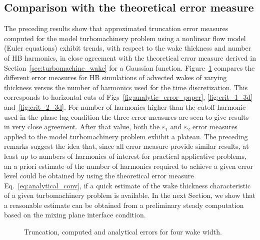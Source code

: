 \subsection{Comparison with the theoretical error measure}
\label{sub:comp_w_analytic}


The preceding results show that approximated truncation error 
measures computed for the model turbomachinery problem 
using a nonlinear flow model (Euler equations) 
exhibit trends, with respect to the wake thickness 
and number of HB harmonics, in close agreement with the 
theoretical error measure derived in Section~\ref{sec:turbomachine_wake} 
for a Gaussian function. 
Figure~\ref{fig:error_comp_curves} compares the 
different error measures for HB simulations of 
advected wakes of varying thickness versus 
the number of harmonics used for the time discretization. 
This corresponds to horizontal cuts of Figs~\ref{fig:analytic_error_paper}, 
\ref{fig:crit_1_3d} and~\ref{fig:crit_2_3d}. 
For number of harmonics higher than the cutoff 
harmonic used in the phase-lag condition 
the three error measures are seen to give 
results in very close agreement. After that value, 
both the $\varepsilon_1$ and $\varepsilon_2$ error 
measures applied to the model turbomachinery problem 
exhibit a plateau.
The preceding remarks suggest the idea that, 
since all error measure provide similar results, 
at least up to numbers of harmonics of interest for 
practical applicative problems, an a priori 
estimate of the number of harmonics required 
to achieve a given error level could be 
obtained by using the theoretical error measure 
Eq.~\eqref{eq:analytical_conv}, if a quick 
estimate of the wake thickness characteristic 
of a given turbomachinery problem is available. 
In the next Section, we show that a reasonable 
estimate can be obtained from a preliminary steady 
computation based on the mixing plane interface condition.
\begin{figure}[htb]
  \centering
  \quad
  \quad
  \quad
  \quad
  \caption{Truncation, computed and analytical errors for four wake width.}
  \label{fig:error_comp_curves}
\end{figure}

